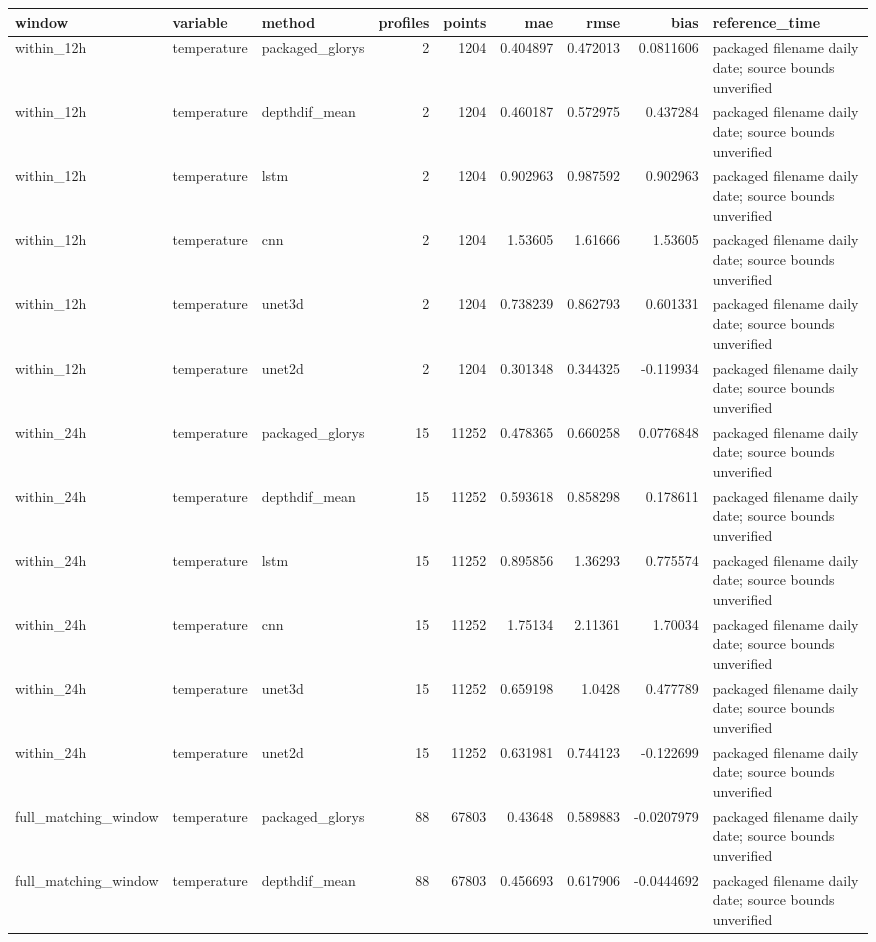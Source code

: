 \begin{tabular}{lllrrrrrl}
\toprule
window & variable & method & profiles & points & mae & rmse & bias & reference_time \\
\midrule
within_12h & temperature & packaged_glorys & 2 & 1204 & 0.404897 & 0.472013 & 0.0811606 & packaged filename daily date; source bounds unverified \\
within_12h & temperature & depthdif_mean & 2 & 1204 & 0.460187 & 0.572975 & 0.437284 & packaged filename daily date; source bounds unverified \\
within_12h & temperature & lstm & 2 & 1204 & 0.902963 & 0.987592 & 0.902963 & packaged filename daily date; source bounds unverified \\
within_12h & temperature & cnn & 2 & 1204 & 1.53605 & 1.61666 & 1.53605 & packaged filename daily date; source bounds unverified \\
within_12h & temperature & unet3d & 2 & 1204 & 0.738239 & 0.862793 & 0.601331 & packaged filename daily date; source bounds unverified \\
within_12h & temperature & unet2d & 2 & 1204 & 0.301348 & 0.344325 & -0.119934 & packaged filename daily date; source bounds unverified \\
within_24h & temperature & packaged_glorys & 15 & 11252 & 0.478365 & 0.660258 & 0.0776848 & packaged filename daily date; source bounds unverified \\
within_24h & temperature & depthdif_mean & 15 & 11252 & 0.593618 & 0.858298 & 0.178611 & packaged filename daily date; source bounds unverified \\
within_24h & temperature & lstm & 15 & 11252 & 0.895856 & 1.36293 & 0.775574 & packaged filename daily date; source bounds unverified \\
within_24h & temperature & cnn & 15 & 11252 & 1.75134 & 2.11361 & 1.70034 & packaged filename daily date; source bounds unverified \\
within_24h & temperature & unet3d & 15 & 11252 & 0.659198 & 1.0428 & 0.477789 & packaged filename daily date; source bounds unverified \\
within_24h & temperature & unet2d & 15 & 11252 & 0.631981 & 0.744123 & -0.122699 & packaged filename daily date; source bounds unverified \\
full_matching_window & temperature & packaged_glorys & 88 & 67803 & 0.43648 & 0.589883 & -0.0207979 & packaged filename daily date; source bounds unverified \\
full_matching_window & temperature & depthdif_mean & 88 & 67803 & 0.456693 & 0.617906 & -0.0444692 & packaged filename daily date; source bounds unverified \\

\end{tabular}
